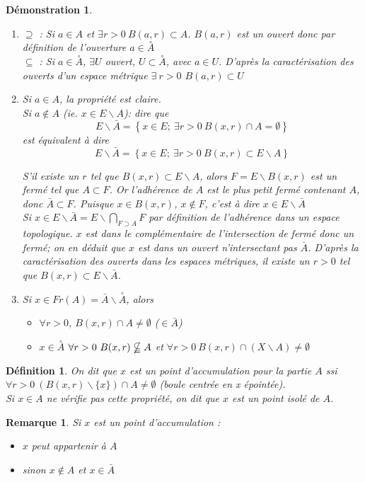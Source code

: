 \documentclass[a4paper, oneside]{report}
\theoremstyle{break}
\newtheorem{defi}[thm]{Définition}
\newtheorem*{demo}{Démonstration}
\newtheorem{remar}[thm]{Remarque}
\newcommand{\cerc}[1]{\overset{\circ}{#1}}
\begin{document}
\begin{demo}
\begin{enumerate}
\item $\supseteq$ : Si $a\in A$ et $\exists r>0~B(a,r)\subset A$. $B(a,r)$ est un ouvert donc par définition de l'ouverture $a\in \cerc{A}$\\
$\subseteq$ : Si $a\in \cerc{A}$, $\exists U$ ouvert, $U\subset \cerc{A}$, avec $a\in U$. D'après la caractérisation des ouverts d'un espace métrique $\exists~r>0$ $B(a,r)\subset U$

\item Si $a\in A$, la propriété est claire.\\
  Si $a\notin A$ (ie. $x \in E\backslash A$):
  dire que
  $$E\backslash \bar{A} = \left\{x\in E;~\exists r>0~ B(x,r) \cap A = \emptyset \right\}$$
  est équivalent à dire
  $$E\backslash \bar{A} = \left\{x\in E;~\exists r>0~ B(x,r) \subset E\backslash A \right\}$$

  S'il existe un $r$ tel que $B(x,r)\subset E\backslash A$, alors $F=E\backslash B(x,r)$ est un fermé tel que $A\subset F$. Or l'adhérence de $A$ est le plus petit fermé contenant $A$, donc $\bar{A}\subset F$. Puisque $x\in B(x, r)$, $x\notin F$, c'est à dire $x\in E\backslash \bar{A}$\\
  Si $x\in E\backslash \bar{A}=E\backslash \bigcap_{F\supset A}F$ par définition de l'adhérence dans un espace topologique. $x$ est dans le complémentaire de l'intersection de fermé donc un fermé; on en déduit que $x$ est dans un ouvert n'intersectant pas $\bar{A}$. D'après la caractérisation des ouverts dans les espaces métriques, il existe un $r>0$ tel que  $B(x, r) \subset E\backslash \bar{A}$.\\

\item Si $x\in Fr(A)=\bar{A} \backslash \cerc{A}$, alors
\begin{itemize}
\item  $\forall r>0$, $B(x,r)\cap A \neq \emptyset$ ($\in \bar{A}$)
\item $x\in \cerc{A}$ $\forall r>0~B(x,r)\nsubseteqq A$ et $\forall r>0~B(x,r)\cap (X\backslash A)\neq \emptyset$
\end{itemize}

\end{enumerate}
\end{demo}



\begin{defi}
On dit que $x$ est un point d'accumulation pour la partie $A$ ssi $\forall r>0~(B(x,r)\backslash \{x\}) \cap A \neq \emptyset$ (boule centrée en x épointée).\\
Si $x\in A$ ne vérifie pas cette propriété, on dit que $x$ est un point isolé de $A$.
\end{defi}
\begin{remar}
Si $x$ est un point d'accumulation :
\begin{itemize}
\item $x$ peut appartenir à $A$
\item sinon $x\notin A$ et $x\in \bar{A}$
\end{itemize}
\end{remar}
\end{document}
